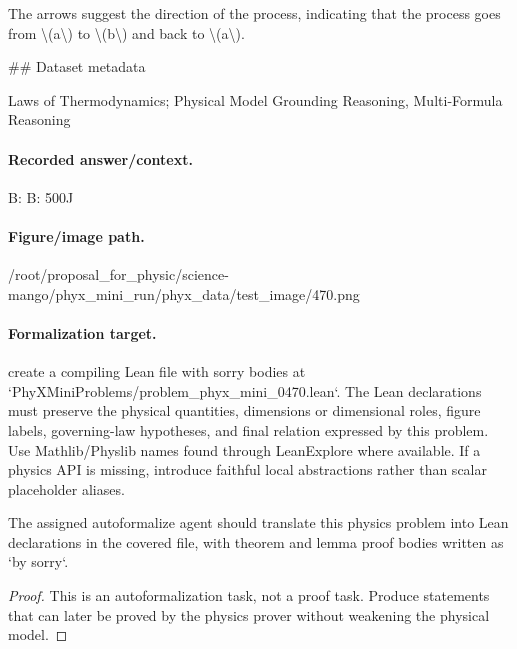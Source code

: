 The arrows suggest the direction of the process, indicating that the process goes from \textbackslash{}(a\textbackslash{}) to \textbackslash{}(b\textbackslash{}) and back to \textbackslash{}(a\textbackslash{}).

\#\# Dataset metadata

Laws of Thermodynamics; Physical Model Grounding Reasoning, Multi-Formula Reasoning

\paragraph{Recorded answer/context.}
B: B: 500J

\paragraph{Figure/image path.}
/root/proposal\_for\_physic/science-mango/phyx\_mini\_run/phyx\_data/test\_image/470.png

\paragraph{Formalization target.}
create a compiling Lean file with sorry bodies at `PhyXMiniProblems/problem\_phyx\_mini\_0470.lean`. The Lean declarations must preserve the physical quantities, dimensions or dimensional roles, figure labels, governing-law hypotheses, and final relation expressed by this problem.
Use Mathlib/Physlib names found through LeanExplore where available. If a physics API is missing, introduce faithful local abstractions rather than scalar placeholder aliases.

\begin{theorem}
\label{thm:physics:phyx_mini_0470:target}
The assigned autoformalize agent should translate this physics problem into Lean declarations in the covered file, with theorem and lemma proof bodies written as `by sorry`.
\end{theorem}
\begin{proof}
This is an autoformalization task, not a proof task. Produce statements that can later be proved by the physics prover without weakening the physical model.
\end{proof}

